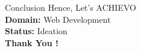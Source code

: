 \documentclass{beamer}
\begin{document}
\begin{frame}{Conclusion}
    \justifying
    Hence, Let's ACHIEVO \\
    \bigskip
    \textbf{Domain: } Web Development \\
    \textbf{Status: } Ideation \\
    \bigskip
    \Huge\textbf{Thank You !}
\end{frame}
\end{document}
